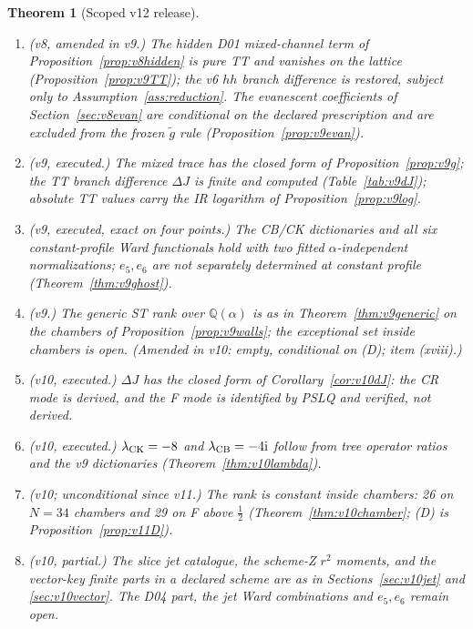 \documentclass[11pt,a4paper]{article}
\newcommand{\ii}{\mathrm i}
\theoremstyle{plain}
\newtheorem{theorem}{Theorem}[section]
\theoremstyle{definition}
\theoremstyle{remark}
\numberwithin{equation}{section}
\begin{document}
\begin{theorem}[Scoped v12 release]
\begin{enumerate}[label=\textup{(\roman*)}]
\item \emph{(v8, amended in v9.)} The hidden D01 mixed-channel term of
Proposition~\ref{prop:v8hidden} is pure TT and vanishes on the lattice
(Proposition~\ref{prop:v9TT}); the v6 \(hh\) branch difference is
restored, subject only to Assumption~\ref{ass:reduction}.
The evanescent coefficients of Section~\ref{sec:v8evan} are
conditional on the declared prescription and are excluded from the
frozen \(\tilde g\) rule (Proposition~\ref{prop:v9evan}).

\item \emph{(v9, executed.)} The mixed trace has the closed form of
Proposition~\ref{prop:v9g}; the TT branch difference \(\Delta J\) is
finite and computed (Table~\ref{tab:v9dJ}); absolute TT values carry
the IR logarithm of Proposition~\ref{prop:v9log}.

\item \emph{(v9, executed, exact on four points.)} The CB/CK
dictionaries and all six constant-profile Ward functionals hold with
two fitted \(\alpha\)-independent normalizations; \(e_5,e_6\) are not
separately determined at constant profile
(Theorem~\ref{thm:v9ghost}).

\item \emph{(v9.)} The generic ST rank over \(\mathbb Q(\alpha)\) is as
in Theorem~\ref{thm:v9generic} on the chambers of
Proposition~\ref{prop:v9walls}; the exceptional set inside chambers is
open. \emph{(Amended in v10: empty, conditional on (D); item (xviii).)}

\item \emph{(v10, executed.)} \(\Delta J\) has the closed form of
Corollary~\ref{cor:v10dJ}: the CR mode is derived, and the F mode is
identified by PSLQ and verified, not derived.

\item \emph{(v10, executed.)} \(\lambda_{\rm CK}=-8\) and
\(\lambda_{\rm CB}=-4\ii\) follow from tree operator ratios and the
v9 dictionaries (Theorem~\ref{thm:v10lambda}).

\item \emph{(v10; unconditional since v11.)} The rank is constant inside
chambers: 26 on \(N=34\) chambers and 29 on F above \(\tfrac12\)
(Theorem~\ref{thm:v10chamber}; (D) is Proposition~\ref{prop:v11D}).

\item \emph{(v10, partial.)} The slice jet catalogue, the scheme-Z
\(r^2\) moments, and the vector-key finite parts in a declared
scheme are as in Sections~\ref{sec:v10jet} and
\ref{sec:v10vector}. The D04 part, the jet Ward combinations and
\(e_5,e_6\) remain open.


\end{enumerate}
\end{theorem}
\end{document}
